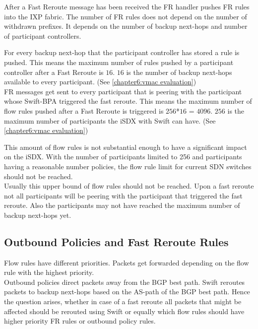 After a Fast Reroute message has been received the FR handler pushes FR rules into the IXP fabric. The number of FR rules does not depend on the number of withdrawn prefixes. It depends on the number of backup next-hops and number of participant controllers. 

For every backup next-hop that the participant controller has stored a rule is pushed. This means the maximum number of rules pushed by a participant controller after a Fast Reroute is $16$. $16$ is the number of backup next-hops available to every participant. (See \ref{chapter6:vmac evaluation}) \\
FR messages get sent to every participant that is peering with the participant whose Swift-BPA triggered the fast reroute. This means the maximum number of flow rules pushed after a Fast Reroute is triggered is $256$*$16$ = $4096$. $256$ is the maximum number of participants the iSDX with Swift can have. (See \ref{chapter6:vmac evaluation}) 

This amount of flow rules is not substantial enough to have a significant impact on the iSDX. With the number of participants limited to 256 and participants having a reasonable number policies, the flow rule limit for current SDN switches should not be reached. \cite[Figure 3 (a)]{gupta2016industrial}\\
Usually this upper bound of flow rules should not be reached. Upon a fast reroute not all participants will be peering with the participant that triggered the fast reroute. Also the participants may not have reached the maximum number of backup next-hops yet.

\subsection{\label{chapter6:number of flow rules:outbound_FR}Outbound Policies and Fast Reroute Rules}

Flow rules have different priorities. Packets get forwarded depending on the flow rule with the highest priority. \\
Outbound policies direct packets away from the BGP best path. Swift reroutes packets to backup next-hops based on the AS-path of the BGP best path. Hence the question arises, whether in case of a fast reroute all packets that might be affected should be rerouted using Swift or equally which flow rules should have higher priority FR rules or outbound policy rules.

